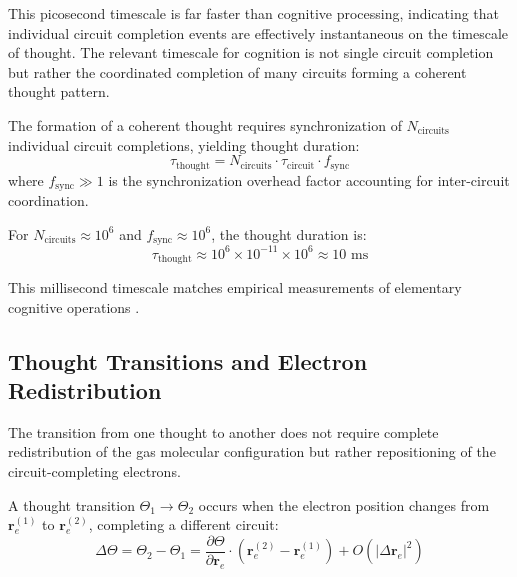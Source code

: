 This picosecond timescale is far faster than cognitive processing, indicating that individual circuit completion events are effectively instantaneous on the timescale of thought. The relevant timescale for cognition is not single circuit completion but rather the coordinated completion of many circuits forming a coherent thought pattern.

\begin{theorem}
\label{thm:coherent_thought}
The formation of a coherent thought requires synchronization of $N_{\text{circuits}}$ individual circuit completions, yielding thought duration:
\begin{equation}
\tau_{\text{thought}} = N_{\text{circuits}} \cdot \tau_{\text{circuit}} \cdot f_{\text{sync}}
\label{eq:thought_duration}
\end{equation}
where $f_{\text{sync}} \gg 1$ is the synchronization overhead factor accounting for inter-circuit coordination.
\end{theorem}

For $N_{\text{circuits}} \approx 10^6$ and $f_{\text{sync}} \approx 10^6$, the thought duration is:
\begin{equation}
\tau_{\text{thought}} \approx 10^6 \times 10^{-11} \times 10^6 \approx 10 \text{ ms}
\end{equation}

This millisecond timescale matches empirical measurements of elementary cognitive operations \citep{thorpe1996speed,vanrullen2001time}.

\subsection{Thought Transitions and Electron Redistribution}

The transition from one thought to another does not require complete redistribution of the gas molecular configuration but rather repositioning of the circuit-completing electrons.

\begin{theorem}
\label{thm:thought_transition}
A thought transition $\Theta_1 \rightarrow \Theta_2$ occurs when the electron position changes from $\mathbf{r}_e^{(1)}$ to $\mathbf{r}_e^{(2)}$, completing a different circuit:
\begin{equation}
\Delta \Theta = \Theta_2 - \Theta_1 = \frac{\partial \Theta}{\partial \mathbf{r}_e} \cdot (\mathbf{r}_e^{(2)} - \mathbf{r}_e^{(1)}) + O(|\Delta \mathbf{r}_e|^2)
\label{eq:thought_transition}
\end{equation}
\end{theorem}

